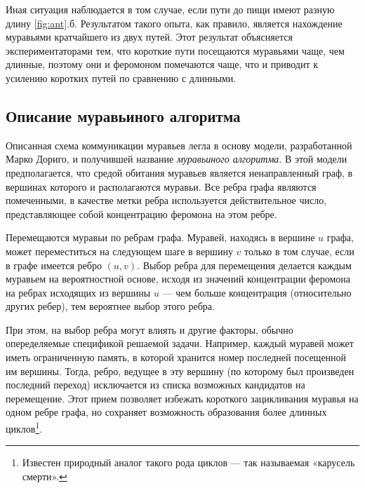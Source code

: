 


Иная ситуация наблюдается в том случае, если пути до пищи имеют
разную длину \ref{fig:ant}.б. Результатом такого опыта, как правило, является нахождение муравьями кратчайшего из двух путей. Этот результат
объясняется экспериментаторами тем, что короткие пути посещаются муравьями чаще, чем длинные, поэтому они и феромоном помечаются чаще,
что и приводит к усилению коротких путей по сравнению с длинными.


\subsection{Описание муравьиного алгоритма}

Описанная схема коммуникации муравьев легла в основу модели, разработанной Марко Дориго, и получившей название \textit{муравьиного алгоритма}. В этой модели предполагается, что средой обитания муравьев является
ненаправленный граф, в вершинах которого и располагаются муравьи. Все
ребра графа являются помеченными, в качестве метки ребра используется
действительное число, представляющее собой концентрацию феромона на
этом ребре.  

Перемещаются муравьи по ребрам графа. Муравей, находясь в вершине
$u$ графа, может переместиться на следующем шаге в вершину $v$ только в том
случае, если в графе имеется ребро $(u, v)$. Выбор ребра для перемещения
делается каждым муравьем на вероятностной основе, исходя из значений
концентрации феромона на ребрах исходящих из вершины $u$ --- чем больше концентрация (относительно других ребер), тем вероятнее выбор этого
ребра.  

При этом, на выбор ребра могут влиять и другие факторы, обычно опеределяемые спецификой решаемой задачи. Например, каждый муравей может иметь ограниченную память, в которой хранится номер последней посещенной им вершины. Тогда, ребро, ведущее в эту вершину (по которому был произведен последний переход) исключается из списка возможных
кандидатов на перемещение. Этот прием позволяет избежать короткого зацикливания муравья на одном ребре графа, но сохраняет возможность образования более длинных циклов\footnote{Известен природный аналог такого рода циклов --- так называемая «карусель смерти».}.  


